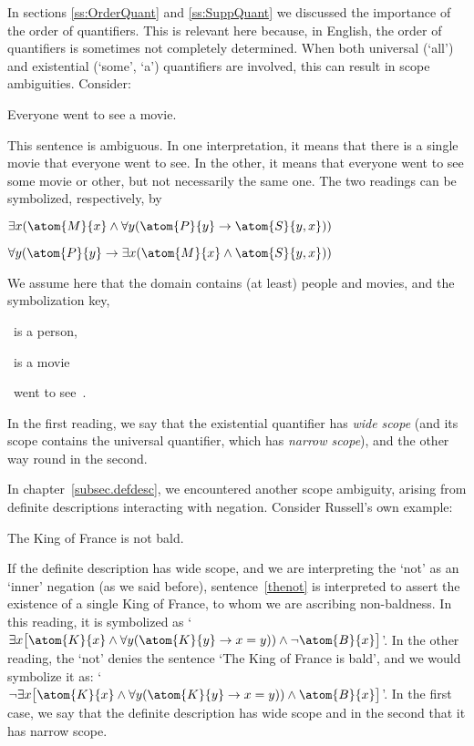In sections \ref{ss:OrderQuant} and \ref{ss:SuppQuant} we discussed the importance of the order of quantifiers.  This is relevant here because, in English, the order of quantifiers is sometimes not completely determined.  When both universal (`all') and existential (`some', `a') quantifiers are  involved, this can result in scope ambiguities. Consider:
\begin{earg}
	\item[\ex{everya}] Everyone went to see a movie.
\end{earg}
This sentence is ambiguous.  In one interpretation, it means that there is a single movie that everyone went to see. In the  other, it means that everyone went to see some movie or other, but not necessarily the same one. The two readings can be symbolized, respectively, by 
\begin{earg}
	\item[] $\exists x(\atom{M}{x} \eand \forall y(\atom{P}{y} \eif \atom{S}{y,x}))$
	\item[] $\forall y(\atom{P}{y} \eif \exists x(\atom{M}{x} \eand \atom{S}{y,x}))$
\end{earg}
We assume here that the domain contains (at least) people and movies, and the symbolization key,
\begin{ekey}
	\item[\atom{P}{y}] ~is a person, 
	\item[\atom{M}{x}] ~is a movie
	\item[\atom{S}{y,x}] ~went to see~.
\end{ekey}
In the first reading, we say that the existential quantifier has \emph{wide scope} (and its scope contains the universal quantifier, which has \emph{narrow scope}), and the other way round in the second.

In chapter~\ref{subsec.defdesc}, we encountered another scope ambiguity, arising from definite descriptions interacting with negation.  Consider Russell's own example:
\begin{earg}
	\item[\ex{thenot}] The King of France is not bald.
\end{earg}
If the definite description has wide scope, and we are interpreting the `not' as an `inner' negation (as we said before), sentence~\ref{thenot} is interpreted to assert the existence of a single King of France, to whom we are ascribing non-baldness. In this reading, it is symbolized as `$\exists x\bigl[\atom{K}{x} \eand \forall y(\atom{K}{y} \eif x=y)) \eand \enot \atom{B}{x}\bigr]$'. In the other reading, the `not' denies the sentence `The King of France is bald', and we would symbolize it as: `$\enot\exists x\bigl[\atom{K}{x} \eand \forall y(\atom{K}{y} \eif x=y)) \eand \atom{B}{x}\bigr]$'. In the first case, we say that the definite description has wide scope and in the second that it has narrow scope.

